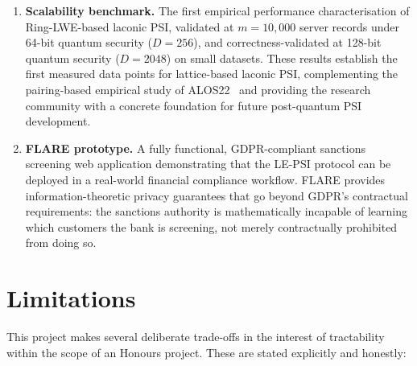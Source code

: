 \begin{enumerate}
    \item \textbf{Scalability benchmark.} The first empirical performance characterisation
          of Ring-LWE-based laconic PSI, validated at $m = 10{,}000$ server records
          under 64-bit quantum security ($D = 256$), and correctness-validated at
          128-bit quantum security ($D = 2048$) on small datasets. These results
          establish the first measured data points for lattice-based laconic PSI,
          complementing the pairing-based empirical study of ALOS22~\cite{alos2022} and
          providing the research community with a concrete foundation for future
          post-quantum PSI development.

    \item \textbf{FLARE prototype.} A fully functional, GDPR-compliant sanctions
          screening web application demonstrating that the LE-PSI protocol can be
          deployed in a real-world financial compliance workflow. FLARE provides
          information-theoretic privacy guarantees that go beyond GDPR's contractual
          requirements: the sanctions authority is mathematically incapable of learning
          which customers the bank is screening, not merely contractually prohibited
          from doing so.
\end{enumerate}

\section{Limitations}

This project makes several deliberate trade-offs in the interest of tractability
within the scope of an Honours project. These are stated explicitly and honestly:


